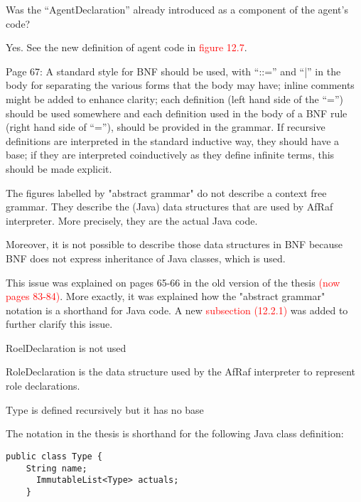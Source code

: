 \documentclass{article}
\newcommand*\R[1]{\textcolor{red}{#1}} %
\newenvironment{them}{\noindent\begingroup\color{blue}}{\endgroup\par}
\begin{document}
\begin{them}

Was the “AgentDeclaration” already introduced as a component of the agent's
code?

\end{them}
Yes. See the new definition of agent code in \R{figure 12.7}.

\begin{them}

Page 67:
A standard style for BNF should be used, with “::=” and “|” in the body for
separating the various forms that the body may have; inline comments might be
added to enhance clarity; each definition (left hand side of the “=”) should be
used somewhere and each definition used in the body of a BNF rule (right hand
side of “=”), should be provided in the grammar. If recursive definitions are
interpreted in the standard inductive way, they should have a base; if they are
interpreted coinductively as they define infinite terms, this should be made
explicit. 

\end{them}
The figures labelled by "abstract grammar" do not describe a context free
grammar. They describe the (Java) data structures that are used by AfRaf
interpreter. More precisely, they are the actual Java code.

Moreover, it is not possible to describe those data structures in BNF because
BNF does not express inheritance of Java classes, which is used.

This issue was explained on pages 65-66 in the old version of the thesis
\R{(now pages 83-84)}. More exactly, it was explained how the "abstract
grammar" notation is a shorthand for Java code. A new \R{subsection (12.2.1)}
was added to further clarify this issue. 

\begin{them}

RoelDeclaration is not used 

\end{them}
RoleDeclaration is the data structure used by the AfRaf interpreter to
represent role declarations.

\begin{them}

Type is defined recursively but it has no base 

\end{them}
The notation in the thesis is shorthand for the following Java class definition:
\begin{verbatim}
public class Type {
    String name;
      ImmutableList<Type> actuals;
    }
\end{verbatim}
\end{document}
